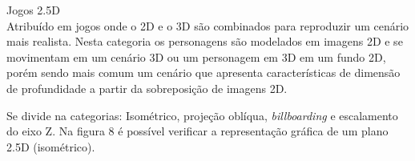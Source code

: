 \begin{alineascomponto}


\item Jogos 2.5D\\
Atribuído em jogos onde o 2D e o 3D são combinados para reproduzir um cenário mais realista. Nesta categoria os personagens são modelados em imagens 2D e se movimentam em um cenário 3D ou um personagem em 3D em um fundo 2D, porém sendo mais comum um cenário que apresenta características de dimensão de profundidade a partir da sobreposição de imagens 2D.

Se divide na categorias: Isométrico, projeção oblíqua, \textit{billboarding} e escalamento do eixo Z. Na figura 8 é possível verificar a representação gráfica de um plano 2.5D (isométrico). \cite{graf}

\end{alineascomponto}


